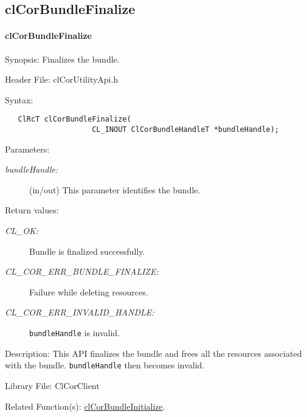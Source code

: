 \begin{flushleft}
\subsection{clCorBundleFinalize}
\hypertarget{pagecor154}{}\paragraph{cl\-Cor\-Bundle\-Finalize}\label{pagecor154}
\begin{Desc}
\item[Synopsis:] Finalizes the bundle.
\end{Desc}
\begin{Desc}
\item[Header File:]clCorUtilityApi.h\end{Desc}
\begin{Desc}
\item[Syntax:]

\footnotesize\begin{verbatim}   ClRcT clCorBundleFinalize(
   					CL_INOUT ClCorBundleHandleT *bundleHandle);

\end{verbatim}
\normalsize
\end{Desc}
\begin{Desc}
\item[Parameters:]
\begin{description}
\item[{\em *bundle\-Handle:}](in/out) This parameter identifies the bundle.
\end{description}
\end{Desc}
\begin{Desc}
\item[Return values:]
\begin{description}
\item[{\em CL\_\-OK:}] Bundle is finalized successfully.
\item[{\em CL\_\-COR\_\-ERR\_\-BUNDLE\_\-FINALIZE:}] Failure while deleting resources.
\item[{\em CL\_\-COR\_\-ERR\_\-INVALID\_\-HANDLE:}] {\tt{bundleHandle}} is invalid.
\end{description}
\end{Desc}
\begin{Desc}
\item[Description:] This API finalizes the bundle and frees all the resources associated with the bundle. {\tt{bundleHandle}} then becomes invalid.
\end{Desc}
\begin{Desc}
\item[Library File:]Cl\-Cor\-Client\end{Desc}
\begin{Desc}
\item[Related Function(s):]\hyperlink{pagecor153}{clCorBundleInitialize}.
\end{Desc}
\newpage






\end{flushleft}

